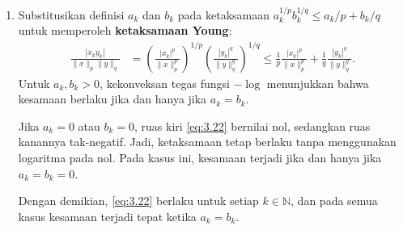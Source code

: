 \documentclass[aspectratio=169,11pt]{beamer}
\theoremstyle{definition}
\newcommand{\N}{\mathbb{N}}
\begin{document}
\begin{frame}[allowframebreaks=1]{\insertsection}{\insertsubsection}
\begin{enumerate}
          \begin{alertblock}{Ketaksamaan Young}
            \small
            Misalkan $a,b\geq0$ dan $1<p,q<\infty$ dengan $1/p+1/q=1$. Maka:
            \begin{equation*}
              ab\leq\frac{a^p}{p}+\frac{b^q}{q}.
            \end{equation*}
            Kesamaan berlaku jika dan hanya jika $a^p=b^q$.

            \textit{Bukti.} Jika $a=0$ atau $b=0$, ketaksamaan langsung berlaku, dengan kesamaan hanya ketika keduanya nol. Untuk $a,b>0$, Jensen pada fungsi konveks tegas $-\log$ memberikan:
            \begin{equation*}
              -\log\left(\frac{a^p}{p}+\frac{b^q}{q}\right)
              \leq-\frac1p\log(a^p)-\frac1q\log(b^q)
              =-\log(ab).
            \end{equation*}
            Karena $-\log$ turun tegas, diperoleh ketaksamaan Young. Syarat kesamaan Jensen adalah $a^p=b^q$. \qed
          \end{alertblock}
    \item Substitusikan definisi $a_k$ dan $b_k$ pada ketaksamaan $a_k^{1/p}b_k^{1/q}\leq a_k/p+b_k/q$ untuk memperoleh \textbf{ketaksamaan Young}:
          \begin{equation}
            \begin{aligned}
              \frac{|x_k y_k|}{\|x\|_p\|y\|_q}
               & =\left(\frac{|x_k|^p}{\|x\|_p^p}\right)^{1/p}
              \left(\frac{|y_k|^q}{\|y\|_q^q}\right)^{1/q}  \leq \frac{1}{p}\frac{|x_k|^p}{\|x\|_p^p}
              +\frac{1}{q}\frac{|y_k|^q}{\|y\|_q^q}.
            \end{aligned}\label{eq:3.22}
          \end{equation}
          Untuk $a_k,b_k>0$, kekonveksan tegas fungsi $-\log$ menunjukkan bahwa kesamaan berlaku jika dan hanya jika $a_k=b_k$.

          Jika $a_k=0$ atau $b_k=0$, ruas kiri \eqref{eq:3.22} bernilai nol, sedangkan ruas kanannya tak-negatif. Jadi, ketaksamaan tetap berlaku tanpa menggunakan logaritma pada nol. Pada kasus ini, kesamaan terjadi jika dan hanya jika $a_k=b_k=0$.

          Dengan demikian, \eqref{eq:3.22} berlaku untuk setiap $k\in\N$, dan pada semua kasus kesamaan terjadi tepat ketika $a_k=b_k$.



\end{enumerate}
\end{frame}
\end{document}
